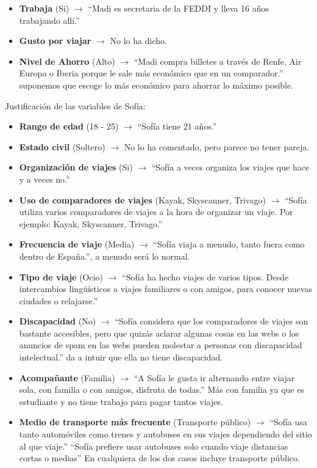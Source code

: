 \begin{itemize}
    \item \textbf{Trabaja} (Si) $\rightarrow$ “Madi es secretaria de la FEDDI y lleva 16 años trabajando allí.”
    \item \textbf{Gusto por viajar} $\rightarrow$ No lo ha dicho.
    \item \textbf{Nivel de Ahorro} (Alto) $\rightarrow$ “Madi compra billetes a través de Renfe, Air Europa o Iberia porque le sale más económico que en un comparador.” suponemos que escoge lo más económico para ahorrar lo máximo posible.
\end{itemize}

\noindent Justificación de las variables de Sofía:
\begin{itemize}
    \item \textbf{Rango de edad} (18 - 25) $\rightarrow$ “Sofía tiene 21 años.”
    \item \textbf{Estado civil} (Soltero) $\rightarrow$ No lo ha comentado, pero parece no tener pareja. 
    \item \textbf{Organización de viajes} (Si) $\rightarrow$ “Sofía a veces organiza los viajes que hace y a veces no.”
    \item \textbf{Uso de comparadores de viajes} (Kayak, Skyscanner, Trivago) $\rightarrow$ “Sofía utiliza varios comparadores de viajes a la hora de organizar un viaje. Por ejemplo: Kayak, Skyscanner, Trivago.”
    \item \textbf{Frecuencia de viaje} (Media) $\rightarrow$ “Sofía viaja a menudo, tanto fuera como dentro de España.”, a menudo será lo normal.
    \item \textbf{Tipo de viaje} (Ocio) $\rightarrow$ “Sofía ha hecho viajes de varios tipos. Desde intercambios lingüísticos a viajes familiares o con amigos, para conocer nuevas ciudades o relajarse.”
    \item \textbf{Discapacidad} (No) $\rightarrow$ “Sofía considera que los comparadores de viajes son bastante accesibles, pero que quizás aclarar algunas cosas en las webs o los anuncios de spam en las webs pueden molestar a personas con discapacidad intelectual.” da a intuir que ella no tiene discapacidad.
    \item \textbf{Acompañante} (Familia) $\rightarrow$ “A Sofía le gusta ir alternando entre viajar sola, con familia o con amigos, disfruta de todas.” Más con familia ya que es estudiante y no tiene trabajo para pagar tantos viajes.
    \item \textbf{Medio de transporte más frecuente} (Transporte público) $\rightarrow$ “Sofía usa tanto automóviles como trenes y autobuses en sus viajes dependiendo del sitio al que viaje.” “Sofía prefiere usar autobuses solo cuando viaje distancias cortas o medias” En cualquiera de los dos casos incluye transporte público.

\end{itemize}
